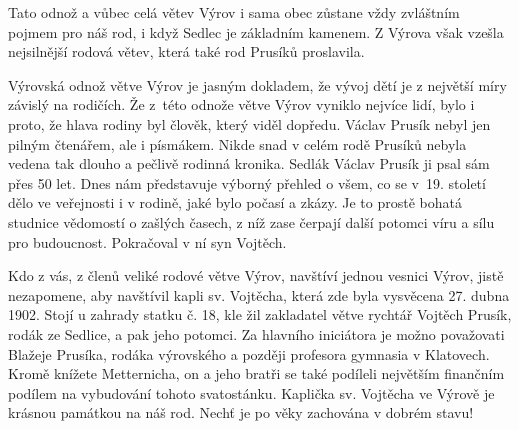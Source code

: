 \documentclass[../dejiny-rodu-prusiku.tex]{subfiles}
\begin{document}
Tato odnož a vůbec celá větev Výrov i sama obec zůstane vždy zvláštním pojmem pro náš rod, i když Sedlec je základním kamenem. Z Výrova však vzešla nejsilnější rodová větev, která také rod Prusíků proslavila.

Výrovská odnož větve Výrov je jasným dokladem, že vývoj dětí je z největší míry závislý na rodičích. Že z této odnože větve Výrov vyniklo nejvíce lidí, bylo i proto, že hlava rodiny byl člověk, který viděl dopředu. Václav Prusík nebyl jen pilným čtenářem, ale i písmákem. Nikde snad v celém rodě Prusíků nebyla vedena tak dlouho a pečlivě rodinná kronika. Sedlák Václav Prusík ji psal sám přes 50 let. Dnes nám představuje výborný přehled o všem, co se v 19. století dělo ve veřejnosti i v rodině, jaké bylo počasí a zkázy. Je to prostě bohatá studnice vědomostí o zašlých časech, z níž zase čerpají další potomci víru a sílu pro budoucnost. Pokračoval v ní syn Vojtěch.

Kdo z vás, z členů veliké rodové větve Výrov, navštíví jednou vesnici Výrov, jistě nezapomene, aby navštívil kapli sv. Vojtěcha, která zde byla vysvěcena 27. dubna 1902. Stojí u zahrady statku č. 18, kle žil zakladatel větve rychtář Vojtěch Prusík, rodák ze Sedlice, a pak jeho potomci. Za hlavního iniciátora je možno považovati Blažeje Prusíka, rodáka výrovského a později profesora gymnasia v Klatovech. Kromě knížete Metternicha, on a jeho bratři se také podíleli největším finančním podílem na vybudování tohoto svatostánku. Kaplička sv. Vojtěcha ve Výrově je krásnou památkou na náš rod. Nechť je po věky zachována v dobrém stavu!
\end{document}
